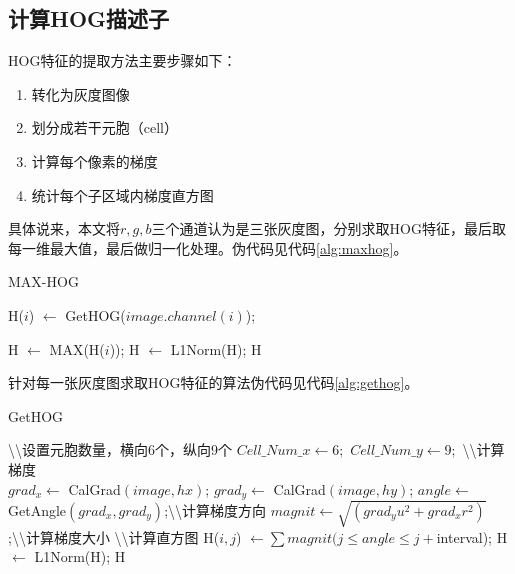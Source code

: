 \subsection{计算HOG描述子}
HOG特征的提取方法主要步骤如下：
\begin{enumerate}
  \item 转化为灰度图像
  \item 划分成若干元胞（cell）
  \item 计算每个像素的梯度
  \item 统计每个子区域内梯度直方图
\end{enumerate}

具体说来，本文将$r,g,b$三个通道认为是三张灰度图，分别求取HOG特征，最后取每一维最大值，最后做归一化处理。伪代码见代码\ref{alg:maxhog}。
\newcommand{\comment}{\textbackslash\textbackslash}
\begin{algorithm}
  \caption{MAX-HOG}\label{alg:maxhog}
  \begin{algorithmic}[1]

        \STATE H($i$) $\leftarrow$ GetHOG($image.channel(i)$);
    \ENDFOR

    \STATE  H $\leftarrow$ MAX(H($i$));
    \STATE  H $\leftarrow$ L1Norm(H);
    \RETURN H
  \end{algorithmic}
\end{algorithm}

针对每一张灰度图求取HOG特征的算法伪代码见代码\ref{alg:gethog}。

\begin{algorithm}
  \caption{GetHOG}\label{alg:gethog}
  \begin{algorithmic}[1]
    \STATE \comment 设置元胞数量，横向6个，纵向9个
    \STATE $Cell\_Num\_x \leftarrow 6;$
    \STATE $Cell\_Num\_y \leftarrow 9;$
    \STATE \comment 计算梯度\\
    \STATE $grad_x \leftarrow$ CalGrad$(image,hx)$;
    \STATE $grad_y \leftarrow$ CalGrad$(image,hy)$;
    \STATE $angle \leftarrow$ GetAngle$(grad_x,grad_y)$;\comment 计算梯度方向
    \STATE $magnit \leftarrow \sqrt{(grad_yu^2+grad_xr^2)}$;\comment 计算梯度大小
    \STATE \comment 计算直方图
            \STATE H($i,j$) $\leftarrow \sum magnit(j \leq angle \leq j+$interval);
        \ENDFOR
    \ENDFOR
    \STATE  H $\leftarrow$ L1Norm(H);
    \RETURN H
  \end{algorithmic}
\end{algorithm}

